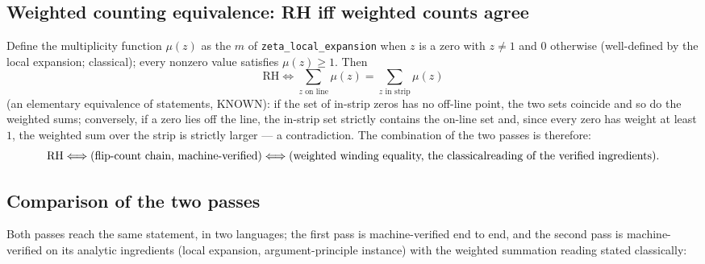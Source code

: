 \documentclass{article}
\begin{document}
\subsection{Weighted counting equivalence: RH iff weighted counts agree}
\label{sec:partII:weighted}

Define the multiplicity function $\mu(z)$ as the $m$ of
\texttt{zeta\_local\_expansion} when $z$ is a zero with $z\ne 1$ and $0$
otherwise (well-defined by the local expansion; classical); every nonzero
value satisfies $\mu(z)\ge 1$. Then
\begin{equation}
\text{RH}\Longleftrightarrow
\sum_{z\text{ on line}}\mu(z)=\sum_{z\text{ in strip}}\mu(z)
\end{equation}
(an elementary equivalence of statements, KNOWN): if the set of
in-strip zeros has no off-line point, the two sets coincide and so do the
weighted sums; conversely, if a zero lies off the line, the in-strip set
strictly contains the on-line set and, since every zero has weight at
least $1$, the weighted sum over the strip is strictly larger --- a
contradiction. The combination of the two passes is therefore:
\begin{equation}
\text{RH}
\Longleftrightarrow \text{(flip-count chain, machine-verified)}
\Longleftrightarrow \text{(weighted winding equality, the classical} \\
\text{reading of the verified ingredients)}.
\end{equation}

\subsection{Comparison of the two passes}
\label{sec:partII:compare}

Both passes reach the same statement, in two languages; the first pass is
machine-verified end to end, and the second pass is machine-verified on
its analytic ingredients (local expansion, argument-principle instance)
with the weighted summation reading stated classically:
\end{document}
